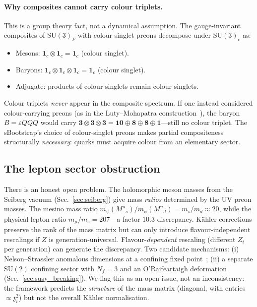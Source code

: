 \documentclass[12pt,a4paper]{article}
\newcommand{\SU}{\mathrm{SU}}
\newcommand{\Nf}{N_{\!f}}
\newcommand{\zch}{\mathfrak{z}}
\begin{document}
\paragraph{Why composites cannot carry colour triplets.}
This is a group theory fact, not a dynamical assumption.
The gauge-invariant composites of $\SU(3)_F$ with colour-singlet
preons decompose under $\SU(3)_c$ as:
\begin{itemize}
  \item Mesons: $\mathbf{1}_c \otimes \mathbf{1}_c = \mathbf{1}_c$
    (colour singlet).
  \item Baryons: $\mathbf{1}_c \otimes \mathbf{1}_c \otimes
    \mathbf{1}_c = \mathbf{1}_c$ (colour singlet).
  \item Adjugate: products of colour singlets remain colour singlets.
\end{itemize}
Colour triplets \emph{never} appear in the composite spectrum.
If one instead considered colour-carrying preons (as in the
Luty--Mohapatra construction~\cite{LutyMohapatra:1997}), the
baryon $B = \varepsilon QQQ$ would carry
$\mathbf{3} \otimes \mathbf{3} \otimes \mathbf{3}
= \mathbf{10} \oplus \mathbf{8} \oplus \mathbf{8}
\oplus \mathbf{1}$---still no colour triplet.
The sBootstrap's choice of colour-singlet preons makes partial
compositeness structurally \emph{necessary}: quarks must acquire
colour from an elementary sector.


\subsection{The lepton sector obstruction}

There is an honest open problem.
The holomorphic meson masses from the Seiberg vacuum
(Sec.~\ref{sec:seiberg}) give mass \emph{ratios}
determined by the UV preon masses.
The mesino mass ratio
$m_\psi(M^u{}_s)/m_\psi(M^u{}_d) = m_s/m_d \approx 20$,
while the physical lepton ratio $m_\mu/m_e = 207$---a factor
$10.3$ discrepancy.
K\"ahler corrections preserve the rank of the mass matrix but
can only introduce flavour-independent rescalings if $Z$ is
generation-universal.
Flavour-\emph{dependent} rescaling (different $Z_i$ per
generation) can generate the discrepancy.
Two candidate mechanisms:
(i) Nelson--Strassler anomalous dimensions at a confining
fixed point~\cite{NelsonStrassler:2000};
(ii) a separate $\SU(2)$ confining sector with $\Nf = 3$ and
an O'Raifeartaigh deformation (Sec.~\ref{sec:susy_breaking}).
We flag this as an open issue, not an inconsistency: the
framework predicts the \emph{structure} of the mass matrix
(diagonal, with entries $\propto \zch_i^2$) but not the
overall K\"ahler normalisation.
\end{document}
